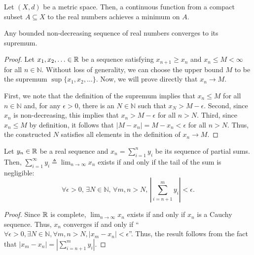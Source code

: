 \begin{corollary}
Let $(X,d)$ be a metric space.
Then, a continuous function from a compact subset $A\subseteq X$ to the real numbers achieves a minimum on $A$.
\end{corollary}

\begin{theorem}
Any bounded non-decreasing sequence of real numbers converges to its supremum.
\end{theorem}
\begin{proof}
Let $x_1,x_2,\ldots \in \mathbb{R}$ be a sequence satisfying $x_{n+1} \geq x_n$ and $x_n \leq M < \infty$ for all $n\in \mathbb{N}$.
Without loss of generality, we can choose the upper bound $M$ to be the supremum $\sup \{x_1,x_2,\ldots\}$.
Now, we will prove directly that $x_n \to M$.

First, we note that the definition of the supremum implies that $x_n \leq M$ for all $n\in \mathbb{N}$ and, for any $\epsilon >0$, there is an $N\in \mathbb{N}$ such that $x_N > M-\epsilon$.
Second, since $x_n$ is non-decreasing, this implies that $x_n > M-\epsilon$ for all $n>N$.
Third, since $x_n \leq M$ by definition, it follows that $|M - x_n| = M-x_n < \epsilon$ for all $n>N$.
Thus, the constructed $N$ satisfies all elements in the definition of $x_n \to M$.
\end{proof}


\begin{lemma} \label{lem:sum_convergence}
Let $y_n \in \mathbb{R}$ be a real sequence and $x_n = \sum_{i=1}^n y_i$ be its sequence of partial sums.
Then, $\sum_{i=1}^\infty y_i \triangleq \lim_{n\to \infty} x_n$ exists if and only if the tail of the sum is negligible:
\[ \forall \epsilon > 0, \, \exists N \in \mathbb{N}, \, \forall m,n>N, \, \left| \sum_{i=n+1}^m y_i \right| < \epsilon. \]
\end{lemma}
\begin{proof}
Since $\mathbb{R}$ is complete, $\lim_{n\to\infty} x_n$ exists if and only if $x_n$ is a Cauchy sequence.
Thus, $x_n$ converges if and only if ``$\forall \epsilon>0, \exists N\in \mathbb{N}, \forall m,n>N, |x_m - x_n|< \epsilon$''.
Thus, the result follows from the fact that $|x_m - x_n| = \left| \sum_{i=n+1}^m y_i \right|$.
\end{proof}

